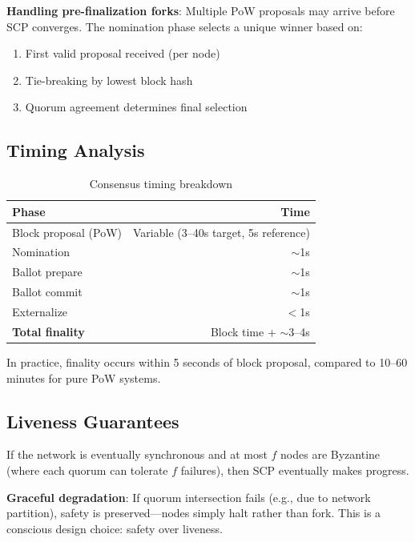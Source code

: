 \textbf{Handling pre-finalization forks}: Multiple PoW proposals may arrive
before SCP converges. The nomination phase selects a unique winner based on:
\begin{enumerate}
  \item First valid proposal received (per node)
  \item Tie-breaking by lowest block hash
  \item Quorum agreement determines final selection
\end{enumerate}



\subsection{Timing Analysis}

\begin{table}[h]
\centering
\caption{Consensus timing breakdown}
\label{tab:timing}
\begin{tabular}{@{}lr@{}}
\toprule
\textbf{Phase} & \textbf{Time} \\
\midrule
Block proposal (PoW) & Variable (3--40s target, 5s reference) \\
Nomination & $\sim$1s \\
Ballot prepare & $\sim$1s \\
Ballot commit & $\sim$1s \\
Externalize & $<$1s \\
\midrule
\textbf{Total finality} & Block time + $\sim$3--4s \\
\bottomrule
\end{tabular}
\end{table}

In practice, finality occurs within 5 seconds of block proposal, compared
to 10--60 minutes for pure PoW systems.

\subsection{Liveness Guarantees}
\label{sec:consensus-liveness}

\begin{theorem}
If the network is eventually synchronous and at most $f$ nodes are Byzantine
(where each quorum can tolerate $f$ failures), then SCP eventually makes
progress.
\end{theorem}

\textbf{Graceful degradation}: If quorum intersection fails (e.g., due to
network partition), safety is preserved---nodes simply halt rather than
fork. This is a conscious design choice: safety over liveness.

